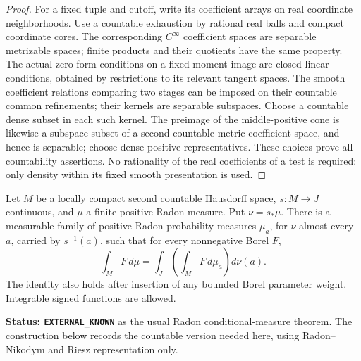 \begin{proof}
For a fixed tuple and cutoff, write its coefficient arrays on
real coordinate neighborhoods. Use a countable exhaustion by
rational real balls and compact coordinate cores. The corresponding
$C^\infty$ coefficient spaces are separable metrizable spaces;
finite products and their quotients have the same property. The
actual zero-form conditions on a fixed moment image are closed
linear conditions, obtained by restrictions to its relevant tangent
spaces. The smooth coefficient relations comparing two stages can
be imposed on their countable common refinements; their kernels
are separable subspaces. Choose a countable dense subset in each
such kernel. The preimage of the middle-positive cone is likewise
a subspace subset of a second countable metric coefficient space,
and hence is separable; choose dense positive representatives.
These choices prove all countability assertions. No rationality of
the real coefficients of a test is required: only density within
its fixed smooth presentation is used.
\end{proof}

\begin{lemma}
\label{lem:r12-Radon-conditional-measures}
Let $M$ be a locally compact second countable Hausdorff space,
$s:M\to J$ continuous, and $\mu$ a finite positive Radon measure.
Put $\nu=s_*\mu$. There is a measurable family of positive Radon
probability measures $\mu_a$, for $\nu$-almost every $a$, carried
by $s^{-1}(a)$, such that for every nonnegative Borel $F$,
\[
                       \int_M F\,d\mu
                          =\int_J\left(\int_M F\,d\mu_a\right)d\nu(a).
 \tag{DI2}
\]
The identity also holds after insertion of any bounded Borel
parameter weight. Integrable signed functions are allowed.
\end{lemma}

\noindent\textbf{Status: \texttt{EXTERNAL\_KNOWN}} as the usual
Radon conditional-measure theorem. The construction below records
the countable version needed here, using Radon--Nikodym and Riesz
representation only.


